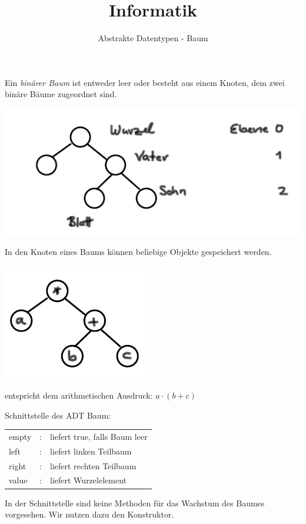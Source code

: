 \documentclass{beamer}
\begin{document}
\title{Informatik}   
\author{Abstrakte Datentypen - Baum} 
\date{}
\frame{\titlepage} 

\begin{frame}[fragile]

Ein \textit{binärer Baum} ist entweder leer oder besteht aus einem Knoten, dem zwei binäre Bäume zugeordnet sind. 

\includegraphics[scale=0.8]{bild1.png}
\end{frame}

\begin{frame}[fragile]

In den Knoten eines Baums können beliebige Objekte gespeichert werden.  

\includegraphics[scale=0.8]{bild2.png} \pause

entspricht dem arithmetischen Ausdruck:  $a \cdot (b + c)$
\end{frame}

\begin{frame}[fragile]

Schnittstelle des ADT Baum:

\begin{tabular}{l l l }
 empty & : & liefert true, falls Baum leer \\
 left & : & liefert linken Teilbaum\\
 right & :  & liefert rechten Teilbaum\\ 
 value & : & liefert Wurzelelement \\
\end{tabular} 


In der Schnittstelle sind keine Methoden für das Wachstum des Baumes vorgesehen.  Wir nutzen dazu den Konstruktor.
\end{frame}
\end{document}
